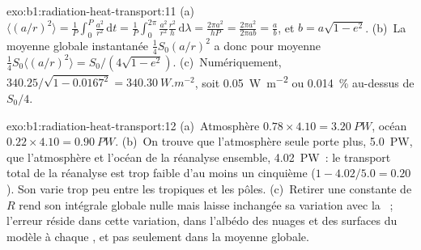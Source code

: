 \begin{solution}{exo:b1:radiation-heat-transport:11}
(a)~$\langle (a/r)^2\rangle = \frac1P\int_0^P \frac{a^2}{r^2}\,\mathrm dt =
\frac1P\int_0^{2\pi}\frac{a^2}{r^2}\frac{r^2}{h}\,\mathrm d\lambda = \frac{2\pi
a^2}{hP} = \frac{2\pi a^2}{2\pi a b} = \frac ab$, et $b = a\sqrt{1-e^2}$.
(b)~La moyenne globale instantanée $\frac14 S_0(a/r)^2$ a donc pour moyenne $\frac14 S_0
\langle(a/r)^2\rangle = S_0/(4\sqrt{1-e^2})$. (c)~Numériquement, $340.25/\sqrt{1 - 0.0167^2} =
\qty{340.30}{W.m^{-2}}$, soit \qty{0.05}{W.m^{-2}} ou \qty{0.014}{\percent} au-dessus de
$S_0/4$.
\end{solution}

\begin{solution}{exo:b1:radiation-heat-transport:12}
(a)~Atmosphère $0.78 \times 4.10 = \qty{3.20}{PW}$, océan $0.22 \times 4.10 =
\qty{0.90}{PW}$. (b)~On trouve que l'atmosphère seule porte plus, \qty{5.0}{PW},
que l'atmosphère et l'océan de la réanalyse ensemble, \qty{4.02}{PW}~: le
transport total de la réanalyse est trop faible d'au moins un cinquième ($1 - 4.02/5.0 = 0.20$).
Son  varie trop peu entre les tropiques et les pôles. (c)~Retirer une
constante de $R$ rend son intégrale globale nulle mais laisse inchangée sa variation avec la
~; l'erreur réside dans cette variation, dans l'albédo des nuages et des surfaces du
modèle à chaque , et pas seulement dans la moyenne globale.
\end{solution}

